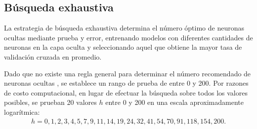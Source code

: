 %
\subsection{Búsqueda exhaustiva}
%
La estrategia de búsqueda exhaustiva determina el número óptimo de
neuronas ocultas mediante prueba y error, entrenando modelos con
diferentes cantidades de neuronas en la capa oculta y seleccionando
aquel que obtiene la mayor tasa \GM{} de validación cruzada en
promedio.

Dado que no existe una regla general para determinar el número
recomendado de neuronas ocultas \cite{nnfaq3}, se establece un rango
de prueba de entre 0 y 200.
Por razones de costo computacional, en lugar de efectuar la búsqueda
sobre todos los valores posibles, se prueban 20 valores $h$ entre 0 y
200 en una escala aproximadamente logarítmica:
%
\begin{align}
  \label{mlp-hidden-tries}
  h=0,1,2,3,4,5,7,9,11,14,19,24,32,41,54,70,91,118,154,200.
\end{align}
%
